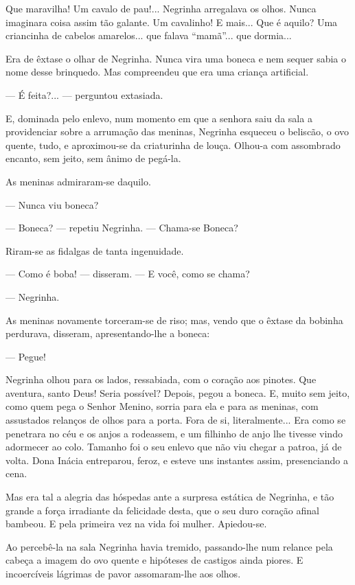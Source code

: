 Que maravilha! Um cavalo de pau!... Negrinha arregalava os olhos. Nunca
imaginara coisa assim tão galante. Um cavalinho! E mais... Que é aquilo?
Uma criancinha de cabelos amarelos... que falava ``mamã''... que
dormia...

Era de êxtase o olhar de Negrinha. Nunca vira uma boneca e nem sequer
sabia o nome desse brinquedo. Mas compreendeu que era uma criança
artificial.

--- É feita?... --- perguntou extasiada.

E, dominada pelo enlevo, num momento em que a senhora saiu da sala a
providenciar sobre a arrumação das meninas, Negrinha esqueceu o
beliscão, o ovo quente, tudo, e aproximou-se da criaturinha de louça.
Olhou-a com assombrado encanto, sem jeito, sem ânimo de pegá-la.

As meninas admiraram-se daquilo.

--- Nunca viu boneca?

--- Boneca? --- repetiu Negrinha. --- Chama-se Boneca?

Riram-se as fidalgas de tanta ingenuidade.

--- Como é boba! --- disseram. --- E você, como se chama?

--- Negrinha.

As meninas novamente torceram-se de riso; mas, vendo que o êxtase da
bobinha perdurava, disseram, apresentando-lhe a boneca:

--- Pegue!

Negrinha olhou para os lados, ressabiada, com o coração aos pinotes. Que
aventura, santo Deus! Seria possível? Depois, pegou a boneca. E, muito
sem jeito, como quem pega o Senhor Menino, sorria para ela e para as
meninas, com assustados relanços de olhos para a porta. Fora de si,
literalmente... Era como se penetrara no céu e os anjos a rodeassem, e
um filhinho de anjo lhe tivesse vindo adormecer ao colo. Tamanho foi o
seu enlevo que não viu chegar a patroa, já de volta. Dona Inácia
entreparou, feroz, e esteve uns instantes assim, presenciando a cena.

Mas era tal a alegria das hóspedas ante a surpresa estática de Negrinha,
e tão grande a força irradiante da felicidade desta, que o seu duro
coração afinal bambeou. E pela primeira vez na vida foi mulher.
Apiedou-se.

Ao percebê-la na sala Negrinha havia tremido, passando-lhe num relance
pela cabeça a imagem do ovo quente e hipóteses de castigos ainda piores.
E incoercíveis lágrimas de pavor assomaram-lhe aos olhos.

